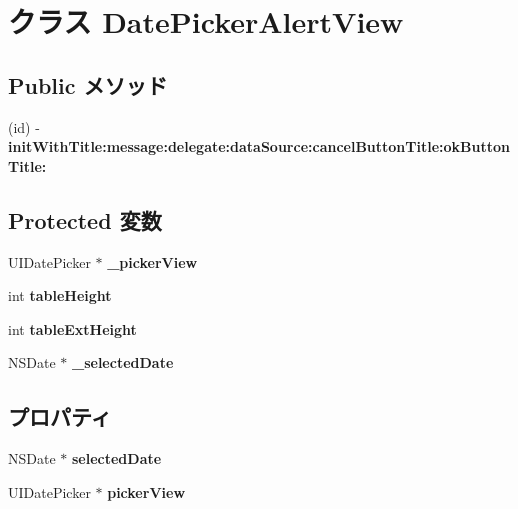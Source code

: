\hypertarget{interface_date_picker_alert_view}{
\section{クラス DatePickerAlertView}
\label{interface_date_picker_alert_view}
}
\subsection*{Public メソッド}
\begin{DoxyCompactItemize}
\item 
\hypertarget{interface_date_picker_alert_view_ad5be267319c81b599185f0c333852ad5}{
(id) -\/ {\bfseries initWithTitle:message:delegate:dataSource:cancelButtonTitle:okButtonTitle:}}
\label{interface_date_picker_alert_view_ad5be267319c81b599185f0c333852ad5}

\end{DoxyCompactItemize}
\subsection*{Protected 変数}
\begin{DoxyCompactItemize}
\item 
\hypertarget{interface_date_picker_alert_view_a37b437bca33a8ad380b3ceaceaf9edad}{
UIDatePicker $\ast$ {\bfseries \_\-pickerView}}
\label{interface_date_picker_alert_view_a37b437bca33a8ad380b3ceaceaf9edad}

\item 
\hypertarget{interface_date_picker_alert_view_a7c02b2a133948a1c496c8a5aea7e686b}{
int {\bfseries tableHeight}}
\label{interface_date_picker_alert_view_a7c02b2a133948a1c496c8a5aea7e686b}

\item 
\hypertarget{interface_date_picker_alert_view_a8b47a57a736107121d9b4513e6214fdb}{
int {\bfseries tableExtHeight}}
\label{interface_date_picker_alert_view_a8b47a57a736107121d9b4513e6214fdb}

\item 
\hypertarget{interface_date_picker_alert_view_a3fe90197b07db9a2aa35c22901715dd9}{
NSDate $\ast$ {\bfseries \_\-selectedDate}}
\label{interface_date_picker_alert_view_a3fe90197b07db9a2aa35c22901715dd9}

\end{DoxyCompactItemize}
\subsection*{プロパティ}
\begin{DoxyCompactItemize}
\item 
\hypertarget{interface_date_picker_alert_view_a9a714296cf7518255a62dd9917084417}{
NSDate $\ast$ {\bfseries selectedDate}}
\label{interface_date_picker_alert_view_a9a714296cf7518255a62dd9917084417}

\item 
\hypertarget{interface_date_picker_alert_view_aef627bb72c5b1603aca220ce421e14dc}{
UIDatePicker $\ast$ {\bfseries pickerView}}
\label{interface_date_picker_alert_view_aef627bb72c5b1603aca220ce421e14dc}

\end{DoxyCompactItemize}


